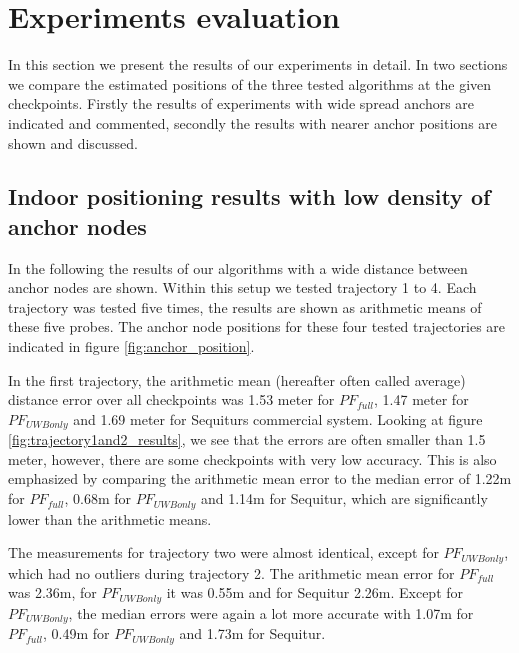 
\chapter{Experiments evaluation} %

\label{Chapter6} %
In this section we present the results of our experiments in detail. In two sections we compare the estimated positions of the three tested algorithms at the given checkpoints. Firstly the results of experiments with wide spread anchors are indicated and commented, secondly the results with nearer anchor positions are shown and discussed.


\section{Indoor positioning results with low density of anchor nodes}
In the following the results of our algorithms with a wide distance between anchor nodes are shown. Within this setup we tested trajectory 1 to 4. Each trajectory was tested five times, the results are shown as arithmetic means of these five probes. The anchor node positions for these four tested trajectories are indicated in figure \ref{fig:anchor_position}.

In the first trajectory, the arithmetic mean (hereafter often called average) distance error over all checkpoints was 1.53 meter for $PF_{full}$, 1.47 meter for $PF_{UWBonly}$ and 1.69 meter for Sequiturs commercial system. Looking at figure \ref{fig:trajectory1and2_results}, we see that the errors are often smaller than 1.5 meter, however, there are some checkpoints with very low accuracy. This is also emphasized by comparing the arithmetic mean error to the median error of 1.22m for $PF_{full}$, 0.68m for $PF_{UWBonly}$ and 1.14m for Sequitur, which are significantly lower than the arithmetic means.

The measurements for trajectory two were almost identical, except for $PF_{UWBonly}$, which had no outliers during trajectory 2. The arithmetic mean error for $PF_{full}$ was 2.36m, for $PF_{UWBonly}$ it was 0.55m and for Sequitur 2.26m. Except for $PF_{UWBonly}$, the median errors were again a lot more accurate with 1.07m for $PF_{full}$, 0.49m for $PF_{UWBonly}$ and 1.73m for Sequitur.

